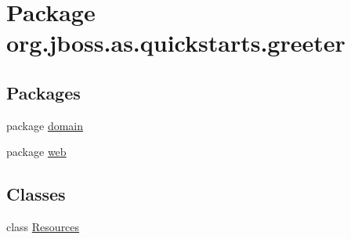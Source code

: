 \hypertarget{namespaceorg_1_1jboss_1_1as_1_1quickstarts_1_1greeter}{}\section{Package org.\+jboss.\+as.\+quickstarts.\+greeter}
\label{namespaceorg_1_1jboss_1_1as_1_1quickstarts_1_1greeter}
\subsection*{Packages}
\begin{DoxyCompactItemize}
\item 
package \hyperlink{namespaceorg_1_1jboss_1_1as_1_1quickstarts_1_1greeter_1_1domain}{domain}
\item 
package \hyperlink{namespaceorg_1_1jboss_1_1as_1_1quickstarts_1_1greeter_1_1web}{web}
\end{DoxyCompactItemize}
\subsection*{Classes}
\begin{DoxyCompactItemize}
\item 
class \hyperlink{classorg_1_1jboss_1_1as_1_1quickstarts_1_1greeter_1_1_resources}{Resources}
\end{DoxyCompactItemize}
